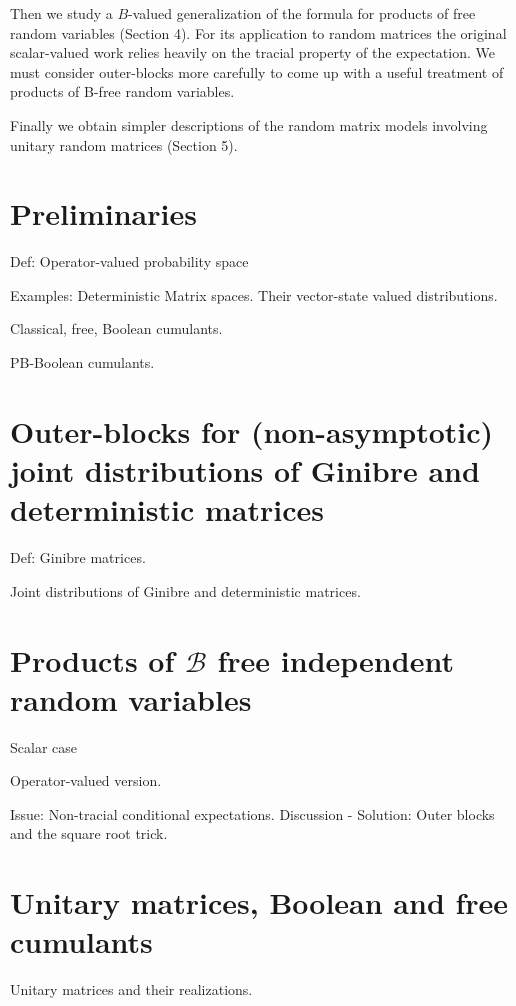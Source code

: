 \documentclass[ECP]{ejpecp} %
\begin{document}
Then we study a $B$-valued generalization of the formula for products of free random variables (Section 4). For its application to random matrices the original scalar-valued work relies heavily on the tracial property of the expectation. We must consider outer-blocks more carefully to come up with a useful treatment of products of B-free random variables.

Finally we obtain simpler descriptions of the random matrix models involving unitary random matrices (Section 5).

\section{Preliminaries}

Def: Operator-valued probability space

Examples: Deterministic Matrix spaces. Their vector-state valued distributions.

Classical, free, Boolean cumulants.

PB-Boolean cumulants.

\section{Outer-blocks for (non-asymptotic) joint distributions of Ginibre and deterministic matrices}

Def: Ginibre matrices.

Joint distributions of Ginibre and deterministic matrices.

\section{Products of $\mathcal B$ free independent random variables}

Scalar case \cite{AV12}

Operator-valued version.

Issue: Non-tracial conditional expectations. Discussion
-
Solution: Outer blocks and the square root trick.

\section{Unitary matrices, Boolean and free cumulants}

Unitary matrices and their realizations.



\end{document}
